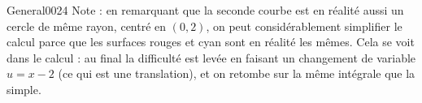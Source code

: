 \begin{corrige}{General0024}
Note : en remarquant que la seconde courbe est en réalité aussi un cercle de même rayon, centré en $(0,2)$, on peut considérablement simplifier le calcul parce que les surfaces rouges et cyan sont en réalité les mêmes. Cela se voit dans le calcul : au final la difficulté est levée en faisant un changement de variable $u=x-2$ (ce qui est une translation), et on retombe sur la même intégrale que la simple.

\end{corrige}
